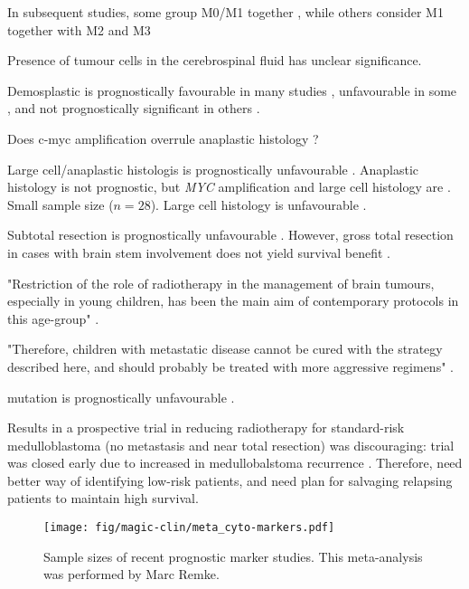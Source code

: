 In subsequent studies, some group M0/M1 together , while others consider M1 together with M2 and M3 

Presence of tumour cells in the cerebrospinal fluid has unclear significance.

Demosplastic is prognostically favourable in many studies , unfavourable in some , and not prognostically significant in others .

Does c-myc amplification overrule anaplastic histology ?

Large cell/anaplastic histologis is prognostically unfavourable .
Anaplastic histology is not prognostic, but \emph{MYC} amplification and large cell histology are . Small sample size ($n = 28$). Large cell histology is unfavourable .

Subtotal resection is prognostically unfavourable . However, gross total resection in cases with brain stem involvement does not yield survival benefit .

"Restriction of the role of radiotherapy in the management of brain tumours, especially in young children, has been the main aim of contemporary protocols in this age-group" .

"Therefore, children with metastatic disease cannot be cured with the strategy described here, and should probably be treated with more aggressive regimens" .

 mutation is prognostically unfavourable .

Results in a prospective trial in reducing radiotherapy for standard-risk medulloblastoma (no metastasis and near total resection) was discouraging: trial was closed early due to increased in medullobalstoma recurrence .
Therefore, need better way of identifying low-risk patients, and need plan for salvaging relapsing patients to maintain high survival.


\begin{SCfigure}[5][t]
	\texttt{[image: fig/magic-clin/meta\_cyto-markers.pdf]}
	\caption[Sample sizes of recent prognostic marker studies]
	{
	Sample sizes of recent prognostic marker studies.
	This meta-analysis was performed by Marc Remke.
	}
	\label{fig:meta_cyto-markers}
\end{SCfigure}

